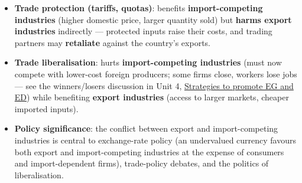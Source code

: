 \begin{itemize}
\begin{itemize}
  \end{itemize}
  \item \textbf{Trade protection (tariffs, quotas)}: benefits \textbf{import-competing industries} (higher domestic price, larger quantity sold) but \textbf{harms export industries} indirectly --- protected inputs raise their costs, and trading partners may \textbf{retaliate} against the country's exports.
  \item \textbf{Trade liberalisation}: hurts \textbf{import-competing industries} (must now compete with lower-cost foreign producers; some firms close, workers lose jobs --- see the winners/losers discussion in Unit 4, \hyperref[sec:strategies]{Strategies to promote EG and ED}) while benefiting \textbf{export industries} (access to larger markets, cheaper imported inputs).
  \item \textbf{Policy significance}: the conflict between export and import-competing industries is central to exchange-rate policy (an undervalued currency favours both export and import-competing industries at the expense of consumers and import-dependent firms), trade-policy debates, and the politics of liberalisation.
\end{itemize}

